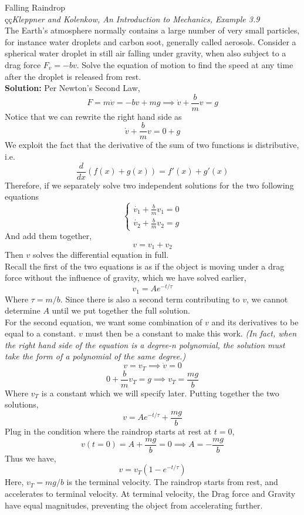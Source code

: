 \documentclass[11pt]{article}
\theoremstyle{gangnamstyle}{\newtheorem{definition}{Definition}[]}
\theoremstyle{gangnamstyle}{\newtheorem{example}{Example}[]}
\theoremstyle{gangnamstyle}{\newtheorem{problem}{Problem}[]}
\theoremstyle{gangnamstyle}{\newtheorem{warning}{Warning}[]}
\begin{document}
\begin{example}
Falling Raindrop \\
çç\textit{Kleppner and Kolenkow, An Introduction to Mechanics, Example 3.9} \\
The Earth’s atmosphere normally contains a large number of very small particles, for instance water droplets and carbon soot, generally called aerosols. Consider a spherical water droplet in still air falling under gravity, when also subject to a drag force $F_v = -bv$. Solve the equation of motion to find the speed at any time after the droplet is released from rest. \\

\textbf{Solution:} Per Newton's Second Law, 
\[ F = m\Dot{v} = -bv + mg \implies \Dot{v} + \frac{b}{m}v = g \]
Notice that we can rewrite the right hand side as
\[ \Dot{v} + \frac{b}{m}v = 0 + g \]
We exploit the fact that the derivative of the sum of two functions is distributive, i.e.
\[ \frac{d}{dx}(f(x) + g(x)) = f'(x) + g'(x) \]
Therefore, if we separately solve two independent solutions for the two following equations
\[ \begin{cases}
\Dot{v_1} + \frac{b}{m}v_1 = 0 \\
\Dot{v_2} + \frac{b}{m}v_2 = g
\end{cases}\]
And add them together, 
\[ v = v_1 + v_2 \]
Then $v$ solves the differential equation in full. \\
Recall the first of the two equations is as if the object is moving under a drag force without the influence of gravity, which we have solved earlier, 
\[ v_1 = Ae^{-t/\tau} \]
Where $\tau = m/b$. Since there is also a second term contributing to $v$, we cannot determine $A$ until we put together the full solution. \\
For the second equation, we want some combination of $v$ and its derivatives to be equal to a constant. $v$ must then be a constant to make this work. \textit{(In fact, when the right hand side of the equation is a degree-n polynomial, the solution must take the form of a polynomial of the same degree.)}
\[ v = v_T \implies \Dot{v} = 0 \]
\[ 0 + \frac{b}{m}v_T = g \implies v_T = \frac{mg}{b} \]
Where $v_T$ is a constant which we will specify later. Putting together the two solutions, 
\[ v = Ae^{-t/\tau} + \frac{mg}{b} \]
Plug in the condition where the raindrop starts at rest at $t = 0$, 
\[ v(t = 0)  = A + \frac{mg}{b} = 0 \implies A = -\frac{mg}{b} \]
Thus we have, 
\[ v = v_T(1 - e^{-t/\tau}) \]
Here, $v_T = mg/b$ is the terminal velocity. The raindrop starts from rest, and accelerates to terminal velocity. At terminal velocity, the Drag force and Gravity have equal magnitudes, preventing the object from accelerating further. 
\end{example}
\end{document}

